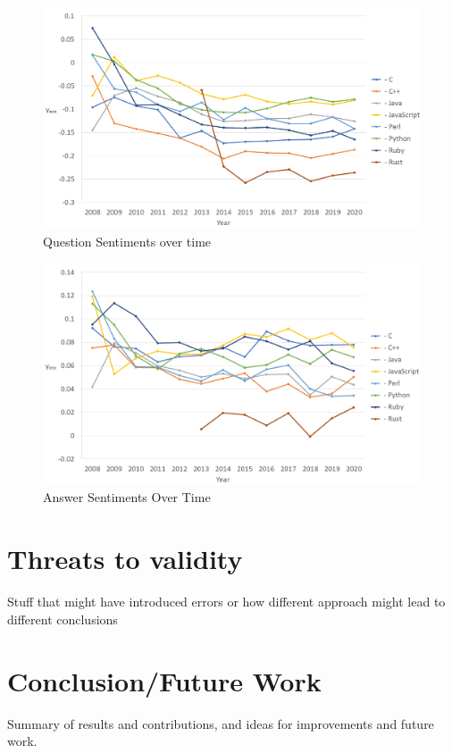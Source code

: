 \documentclass[conference]{IEEEtran}
\begin{document}
\begin{figure}[tbp]
\centering
\includegraphics[width=\textwidth]{figures/time_questions_em.png}
\caption{Question Sentiments over time}
\label{fig}
\end{figure}

\begin{figure}[tbp]
\centering
\includegraphics[width=\textwidth]{figures/time_answers_em.png}
\caption{Answer Sentiments Over Time}
\label{fig}
\end{figure}



\section{Threats to validity}
Stuff that might have introduced errors or how different approach might lead to different conclusions

\section{Conclusion/Future Work}
Summary of results and contributions, and ideas for improvements and future work.\\
\end{document}
